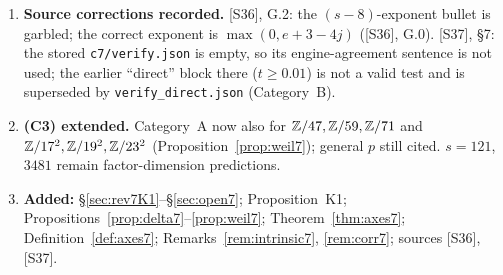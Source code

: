 \begin{enumerate}[label={R7.\arabic*},leftmargin=3em]
\item \textbf{Source corrections recorded.} [S36], G.2: the $(s-8)$-exponent bullet is garbled; the correct exponent is $\max(0,e+3-4j)$ ([S36], G.0). [S37], \S7: the stored \texttt{c7/verify.json} is empty, so its engine-agreement sentence is not used; the earlier ``direct'' block there ($t\ge0.01$) is not a valid test and is superseded by \texttt{verify\_direct.json} (Category~B).
\item \textbf{(C3) extended.} Category~A now also for $\mathbb{Z}/47,\mathbb{Z}/59,\mathbb{Z}/71$ and $\mathbb{Z}/17^2,\mathbb{Z}/19^2,\mathbb{Z}/23^2$ (Proposition~\ref{prop:weil7}); general $p$ still cited. $s=121$, $3481$ remain factor-dimension predictions.
\item \textbf{Added:} \S\ref{sec:rev7K1}--\S\ref{sec:open7}; Proposition~K1; Propositions~\ref{prop:delta7}--\ref{prop:weil7}; Theorem~\ref{thm:axes7}; Definition~\ref{def:axes7}; Remarks~\ref{rem:intrinsic7}, \ref{rem:corr7}; sources [S36], [S37].
\end{enumerate}
